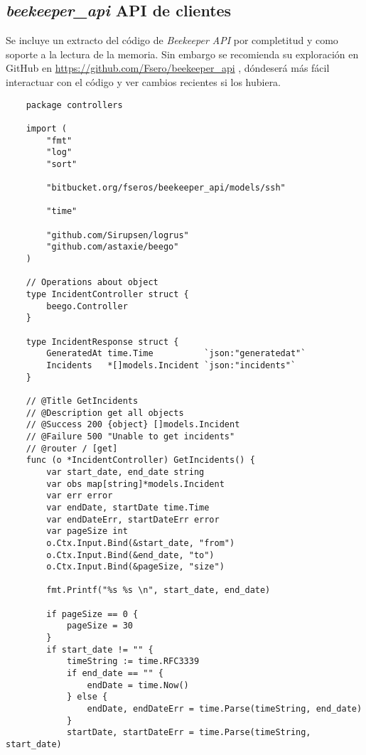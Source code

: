 \subsection{\emph{beekeeper\_api} API de clientes}
\label{subsec:anexos-beekeeper-api-src-code}

Se incluye un extracto del código de \emph{Beekeeper API} por completitud y como soporte a la lectura de la memoria. Sin
embargo se recomienda su exploración en GitHub en \href{https://github.com/Fsero/beekeeper\_api}{https://github.com/Fsero/beekeeper\_api} , dóndeserá más fácil interactuar con el código y ver cambios recientes si los
hubiera.


\begin{verbatim}
    package controllers

    import (
        "fmt"
        "log"
        "sort"

        "bitbucket.org/fseros/beekeeper_api/models/ssh"

        "time"

        "github.com/Sirupsen/logrus"
        "github.com/astaxie/beego"
    )

    // Operations about object
    type IncidentController struct {
        beego.Controller
    }

    type IncidentResponse struct {
        GeneratedAt time.Time          `json:"generatedat"`
        Incidents   *[]models.Incident `json:"incidents"`
    }

    // @Title GetIncidents
    // @Description get all objects
    // @Success 200 {object} []models.Incident
    // @Failure 500 "Unable to get incidents"
    // @router / [get]
    func (o *IncidentController) GetIncidents() {
        var start_date, end_date string
        var obs map[string]*models.Incident
        var err error
        var endDate, startDate time.Time
        var endDateErr, startDateErr error
        var pageSize int
        o.Ctx.Input.Bind(&start_date, "from")
        o.Ctx.Input.Bind(&end_date, "to")
        o.Ctx.Input.Bind(&pageSize, "size")

        fmt.Printf("%s %s \n", start_date, end_date)

        if pageSize == 0 {
            pageSize = 30
        }
        if start_date != "" {
            timeString := time.RFC3339
            if end_date == "" {
                endDate = time.Now()
            } else {
                endDate, endDateErr = time.Parse(timeString, end_date)
            }
            startDate, startDateErr = time.Parse(timeString, start_date)


\end{verbatim}
